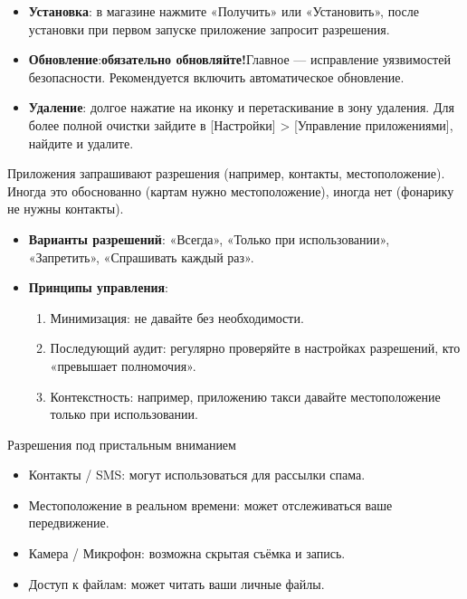 \begin{itemize}
  \item \textbf{Установка}: в магазине нажмите «Получить» или «Установить», после установки при первом запуске приложение запросит разрешения.
  \item \textbf{Обновление}:\textbf{обязательно обновляйте!}Главное — исправление уязвимостей безопасности. Рекомендуется включить автоматическое обновление.
  \item \textbf{Удаление}: долгое нажатие на иконку и перетаскивание в зону удаления. Для более полной очистки зайдите в [Настройки] > [Управление приложениями], найдите и удалите.
\end{itemize}


Приложения запрашивают разрешения (например, контакты, местоположение). Иногда это обоснованно (картам нужно местоположение), иногда нет (фонарику не нужны контакты).

\begin{itemize}
  \item \textbf{Варианты разрешений}: «Всегда», «Только при использовании», «Запретить», «Спрашивать каждый раз».
  \item \textbf{Принципы управления}:
  \begin{enumerate}
    \item Минимизация: не давайте без необходимости.
    \item Последующий аудит: регулярно проверяйте в настройках разрешений, кто «превышает полномочия».
    \item Контекстность: например, приложению такси давайте местоположение только при использовании.
  \end{enumerate}
\end{itemize}

\begin{tcbwarn}{Разрешения под пристальным вниманием}
\begin{itemize}
  \item Контакты / SMS: могут использоваться для рассылки спама.
  \item Местоположение в реальном времени: может отслеживаться ваше передвижение.
  \item Камера / Микрофон: возможна скрытая съёмка и запись.
  \item Доступ к файлам: может читать ваши личные файлы.
\end{itemize}

\end{tcbwarn}

